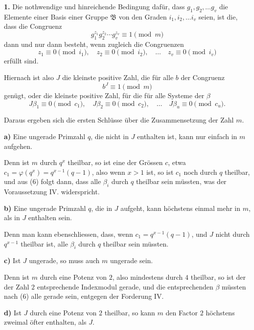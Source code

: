 \documentclass[12pt,a4paper]{article}
\theoremstyle{plain}
\theoremstyle{definition}
\theoremstyle{remark}
\begin{document}
\medskip\noindent\textbf{1.} Die nothwendige und hinreichende Bedingung dafür, dass $g_1, g_2, \ldots g_v$ die Elemente einer Basis einer Gruppe $\mathfrak{B}$ von den Graden $i_1, i_2, \ldots i_v$ seien, ist die, dass die Congruenz
\begin{equation}\tag{4}
g_1^{z_1} g_2^{z_2} \cdots g_v^{z_v} \equiv 1 \pmod{m}
\end{equation}
dann und nur dann besteht, wenn zugleich die Congruenzen
\begin{equation}\tag{5}
z_1 \equiv 0 \pmod{i_1}, \quad z_2 \equiv 0 \pmod{i_2}, \quad \ldots \quad z_v \equiv 0 \pmod{i_v}
\end{equation}
erfüllt sind.

\medskip
Hiernach ist also $J$ die kleinste positive Zahl, die für alle $b$ der Congruenz
\[
b^J \equiv 1 \pmod{m}
\]
genügt, oder die kleinste positive Zahl, für die für alle Systeme der $\beta$
\begin{equation}\tag{6}
J\beta_1 \equiv 0 \pmod{c_1}, \quad J\beta_2 \equiv 0 \pmod{c_2}, \quad \ldots \quad J\beta_u \equiv 0 \pmod{c_u}.
\end{equation}

Daraus ergeben sich die ersten Schlüsse über die Zusammensetzung der Zahl $m$.

\medskip\noindent\textbf{a)} Eine ungerade Primzahl $q$, die nicht in $J$ enthalten ist, kann nur einfach in $m$ aufgehen.

Denn ist $m$ durch $q^x$ theilbar, so ist eine der Grössen $c$, etwa $c_1 = \varphi(q^x) = q^{x-1}(q-1)$, also wenn $x > 1$ ist, so ist $c_1$ noch durch $q$ theilbar, und aus (6) folgt dann, dass alle $\beta_i$ durch $q$ theilbar sein müssten, was der Voraussetzung IV. widerspricht.

\medskip\noindent\textbf{b)} Eine ungerade Primzahl $q$, die in $J$ aufgeht, kann höchstens einmal mehr in $m$, als in $J$ enthalten sein.

Denn man kann ebenschliessen, dass, wenn $c_1 = q^{x-1}(q-1)$, und $J$ nicht durch $q^{x-1}$ theilbar ist, alle $\beta_i$ durch $q$ theilbar sein müssten.

\medskip\noindent\textbf{c)} Ist $J$ ungerade, so muss auch $m$ ungerade sein.

Denn ist $m$ durch eine Potenz von $2$, also mindestens durch $4$ theilbar, so ist der der Zahl $2$ entsprechende Indexmodul gerade, und die entsprechenden $\beta$ müssten nach (6) alle gerade sein, entgegen der Forderung IV.

\medskip\noindent\textbf{d)} Ist $J$ durch eine Potenz von $2$ theilbar, so kann $m$ den Factor $2$ höchstens zweimal öfter enthalten, als $J$.
\end{document}
